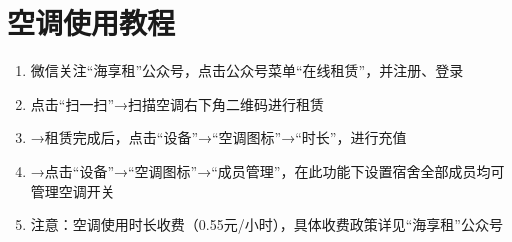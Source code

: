 \section[空调使用教程]{空调使用教程}
\begin{enumerate}
    \item 微信关注“海享租”公众号，点击公众号菜单“在线租赁”，并注册、登录
    \item 点击“扫一扫”→扫描空调右下角二维码进行租赁\footnotemark
    \item →租赁完成后，点击“设备”→“空调图标”→“时长”，进行充值
    \item →点击“设备”→“空调图标”→“成员管理”，在此功能下设置宿舍全部成员均可管理空调开关
    \item 注意：空调使用时长收费（0.55元/小时），具体收费政策详见“海享租”公众号
\end{enumerate}

